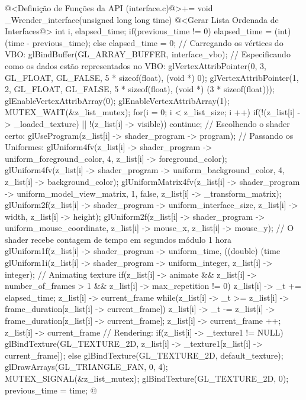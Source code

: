 \iniciocodigo
@<Definição de Funções da API (interface.c)@>+=
void _Wrender_interface(unsigned long long time){
  @<Gerar Lista Ordenada de Interfaces@>
  {
    int i, elapsed_time;
    if(previous_time != 0)
      elapsed_time = (int) (time - previous_time);
    else
      elapsed_time = 0;
    // Carregando os vértices do VBO:
    glBindBuffer(GL_ARRAY_BUFFER, interface_vbo);
    // Especificando como os dados estão representados no VBO:
    glVertexAttribPointer(0, 3, GL_FLOAT, GL_FALSE, 5 * sizeof(float),
                          (void *) 0);
    glVertexAttribPointer(1, 2, GL_FLOAT, GL_FALSE, 5 * sizeof(float),
                          (void *) (3 * sizeof(float)));
    glEnableVertexAttribArray(0);
    glEnableVertexAttribArray(1);
    MUTEX_WAIT(&z_list_mutex);
    for(i = 0; i < z_list_size; i ++){
      if(!(z_list[i] -> _loaded_texture) || !(z_list[i] -> visible))
        continue;
      // Escolhendo o shader certo:
      glUseProgram(z_list[i] -> shader_program -> program);
      // Passando os Uniformes:
      glUniform4fv(z_list[i] -> shader_program -> uniform_foreground_color, 4,
                   z_list[i] -> foreground_color);
      glUniform4fv(z_list[i] -> shader_program -> uniform_background_color, 4,
                   z_list[i] -> background_color);
      glUniformMatrix4fv(z_list[i] -> shader_program ->
                           uniform_model_view_matrix, 1, false,
                         z_list[i] -> _transform_matrix);
      glUniform2f(z_list[i] -> shader_program -> uniform_interface_size,
                  z_list[i] -> width, z_list[i] -> height);
      glUniform2f(z_list[i] -> shader_program -> uniform_mouse_coordinate,
                  z_list[i] -> mouse_x, z_list[i] -> mouse_y);
      // O shader recebe contagem de tempo em segundos módulo 1 hora
      glUniform1f(z_list[i] -> shader_program -> uniform_time,
                  ((double) (time %
      glUniform1i(z_list[i] -> shader_program -> uniform_integer,
                 z_list[i] -> integer);
      // Animating texture
      if(z_list[i] -> animate && z_list[i] -> number_of_frames > 1 &&
         z_list[i] -> max_repetition != 0){
        z_list[i] -> _t += elapsed_time;
        z_list[i] -> current_frame %
        while(z_list[i] -> _t >=
                     z_list[i] -> frame_duration[z_list[i] -> current_frame]){
          z_list[i] -> _t -=
            z_list[i] -> frame_duration[z_list[i] -> current_frame];
          z_list[i] -> current_frame ++;
          z_list[i] -> current_frame %
        }
      }
      // Rendering:
      if(z_list[i] -> _texture1 != NULL)
        glBindTexture(GL_TEXTURE_2D,
                      z_list[i] -> _texture1[z_list[i] -> current_frame]);
      else
        glBindTexture(GL_TEXTURE_2D, default_texture);
      glDrawArrays(GL_TRIANGLE_FAN, 0, 4);
    }
    MUTEX_SIGNAL(&z_list_mutex);
    glBindTexture(GL_TEXTURE_2D, 0);
  }
  previous_time = time;
}
@
\fimcodigo

